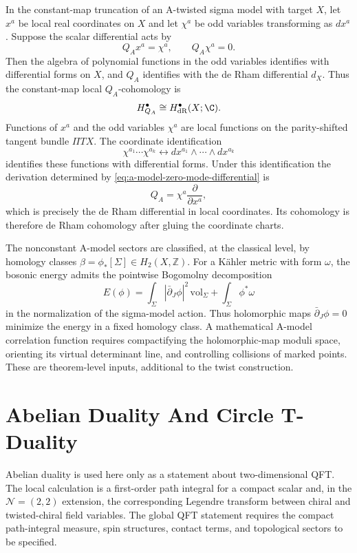 In the constant-map truncation of an A-twisted sigma model with target \(X\),
let \(x^a\) be local real coordinates on \(X\) and let \(\chi^a\) be odd
variables transforming as \(dx^a\).  Suppose the scalar differential acts by
\begin{equation}
  Q_Ax^a=\chi^a,\qquad Q_A\chi^a=0.
  \label{eq:a-model-zero-mode-differential}
\end{equation}
Then the algebra of polynomial functions in the odd variables identifies
with differential forms on \(X\), and \(Q_A\) identifies with the de Rham
differential \(d_X\).  Thus the constant-map local \(Q_A\)-cohomology is
\[
  H^\bullet_{Q_A}\cong H^\bullet_{\rm dR}(X;\C).
\]
Functions of \(x^a\) and the odd variables \(\chi^a\) are local functions on
the parity-shifted tangent bundle \(\Pi TX\).  The coordinate identification
\[
  \chi^{a_1}\cdots\chi^{a_k}
  \longleftrightarrow
  dx^{a_1}\wedge\cdots\wedge dx^{a_k}
\]
identifies these functions with differential forms.  Under this
identification the derivation determined by
\eqref{eq:a-model-zero-mode-differential} is
\[
  Q_A=\chi^a\frac{\partial}{\partial x^a},
\]
which is precisely the de Rham differential in local coordinates.  Its
cohomology is therefore de Rham cohomology after gluing the coordinate
charts.

The nonconstant A-model sectors are classified, at the classical level, by
homology classes \(\beta=\phi_*[\Sigma]\in H_2(X,\mathbb Z)\).  For a
K\"ahler metric with form \(\omega\), the bosonic energy admits the
pointwise Bogomolny decomposition
\begin{equation}
  E(\phi)
  =
  \int_\Sigma |\bar\partial_J\phi|^2\,\mathrm{vol}_\Sigma
  +
  \int_\Sigma\phi^*\omega
  \label{eq:a-model-energy-decomposition}
\end{equation}
in the normalization of the sigma-model action.  Thus holomorphic maps
\(\bar\partial_J\phi=0\) minimize the energy in a fixed homology class.  A
mathematical A-model correlation function requires compactifying the
holomorphic-map moduli space, orienting its virtual determinant line, and
controlling collisions of marked points.  These are theorem-level inputs,
additional to the twist construction.

\section{Abelian Duality And Circle T-Duality}
\label{sec:two-dimensional-abelian-duality}

Abelian duality is used here only as a statement about two-dimensional QFT.
The local calculation is a first-order path integral for a compact scalar
and, in the
\(\mathcal N=(2,2)\) extension, the corresponding Legendre transform between
chiral and twisted-chiral field variables.  The global QFT statement requires
the compact path-integral measure, spin structures, contact terms, and
topological sectors to be specified.

